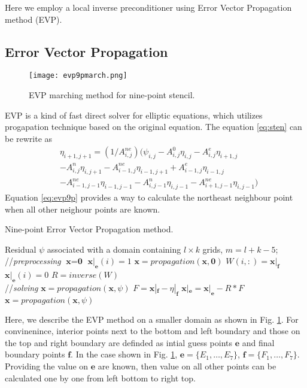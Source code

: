 \documentclass{sig-alternate}
\begin{document}
Here we employ a local inverse preconditioner using Error Vector Propagation method (EVP). 

\subsection{Error Vector Propagation}
\begin {figure}
\centering
\texttt{[image: evp9pmarch.png]}
\caption []{EVP marching method for nine-point stencil.\label {fig:evp9p}}
\end {figure}
EVP is a kind of fast direct solver for elliptic equations, which utilizes progapation technique based on the original equation. 
The equation \ref{eq:sten} can be rewrite as 
\begin{eqnarray}
\label{eq:evp9p}
&\eta_{i+1,j+1} = (1/A_{i,j}^{ne} )(\psi_{i,j} - A_{i,j}^0\eta_{i,j}-A_{i,j}^e\eta_{i+1,j} \nonumber\\
&-A_{i,j}^n\eta_{i,j+1}-A_{i-1,j}^{ne}\eta_{i-1,j+1} +A_{i-1,j}^e\eta_{i-1,j}\nonumber\\
&-A_{i-1,j-1}^{ne}\eta_{i-1,j-1}-A_{i,j-1}^n\eta_{i,j-1}- A_{i+1,j-1}^{ne}\eta_{i,j-1} )
\end{eqnarray}
Equation \ref{eq:evp9p} provides a way to calculate the northeast neighbour point when all other neighour points are known. 

\begin{algorithm}[h]
\caption{Nine-point Error Vector Propagation method.}
\label{alg:evp}
\begin{algorithmic}[1]
\REQUIRE Residual $\psi$ associated with a domain containing $l\times k$ grids, $m = l+k-5$; \\
//\qquad \textit{preprocessing }
\STATE  $\textbf{x} = \textbf{0}$
\STATE $\textbf{x}|_\textbf{e}(i) = 1$
\STATE $\textbf{x} = propagation(\textbf{x},\textbf{0})$
\STATE $W(i,:) = \textbf{x}|_\textbf{f}$
\STATE $\textbf{x}|_\textbf{e}(i) = 0$
\ENDFOR 
\STATE $R = inverse(W)$ \\
//\qquad \textit{solving }
\STATE $\textbf{x}= propagation(\textbf{x},\psi)$
\STATE $F = \textbf{x}|_\textbf{f} - \eta|_\textbf{f}$
\STATE $\textbf{x}|_\textbf{e} =\textbf{x}|_\textbf{e} - R*F$
\STATE $\textbf{x} = propagation(\textbf{x},\psi)$
\end{algorithmic}
\end{algorithm}

Here, we describe the EVP method on a smaller domain as shown in Fig. \ref{fig:evp9p}. For convinenince, interior points next to the bottom and left boundary and those on the top and right boundary are definded as intial guess points $\textbf{e}$ and final boundary points $\textbf{f}$. In the case shown in Fig. \ref{fig:evp9p}, $\textbf{e}= \{E_1, \dots, E_7\}$, $\textbf{f}= \{F_1, \dots, F_7\}$. Providing the value on $\textbf{e}$ are known, then value on all other points can be calculated one by one from left bottom to right top. 
\end{document}
